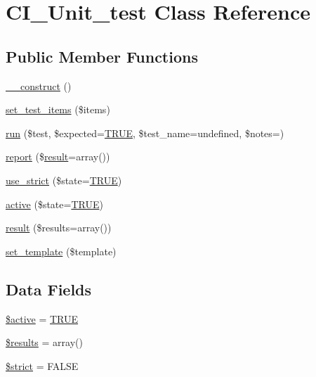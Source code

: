 \hypertarget{class_c_i___unit__test}{}\section{C\+I\+\_\+\+Unit\+\_\+test Class Reference}
\label{class_c_i___unit__test}
\subsection*{Public Member Functions}
\begin{DoxyCompactItemize}
\item 
\mbox{\hyperlink{class_c_i___unit__test_a095c5d389db211932136b53f25f39685}{\+\_\+\+\_\+construct}} ()
\item 
\mbox{\hyperlink{class_c_i___unit__test_a78e364204a36821e23124ae97d447aa3}{set\+\_\+test\+\_\+items}} (\$items)
\item 
\mbox{\hyperlink{class_c_i___unit__test_a0bb74f4cb9553ace4034633e69383c55}{run}} (\$test, \$expected=\mbox{\hyperlink{constants_8php_ae04a3efe6aa42044f803ee90c2277846}{T\+R\+UE}}, \$test\+\_\+name=\textquotesingle{}undefined\textquotesingle{}, \$notes=\textquotesingle{}\textquotesingle{})
\item 
\mbox{\hyperlink{class_c_i___unit__test_a339c46eabb709c1c492bc264c9634171}{report}} (\$\mbox{\hyperlink{class_c_i___unit__test_adcfdd404b2f2610e0690b4beb7786ce5}{result}}=array())
\item 
\mbox{\hyperlink{class_c_i___unit__test_a3b12a79f69fab4221a0b887bdac1ba83}{use\+\_\+strict}} (\$state=\mbox{\hyperlink{constants_8php_ae04a3efe6aa42044f803ee90c2277846}{T\+R\+UE}})
\item 
\mbox{\hyperlink{class_c_i___unit__test_ac7b3030630fc7dd31513c75cf27c1a8a}{active}} (\$state=\mbox{\hyperlink{constants_8php_ae04a3efe6aa42044f803ee90c2277846}{T\+R\+UE}})
\item 
\mbox{\hyperlink{class_c_i___unit__test_adcfdd404b2f2610e0690b4beb7786ce5}{result}} (\$results=array())
\item 
\mbox{\hyperlink{class_c_i___unit__test_ae65d1ab2a626d4ddfda31befc2b347f6}{set\+\_\+template}} (\$template)
\end{DoxyCompactItemize}
\subsection*{Data Fields}
\begin{DoxyCompactItemize}
\item 
\mbox{\hyperlink{class_c_i___unit__test_aacd1fa47b7ea59451aff98beca4360ae}{\$active}} = \mbox{\hyperlink{constants_8php_ae04a3efe6aa42044f803ee90c2277846}{T\+R\+UE}}
\item 
\mbox{\hyperlink{class_c_i___unit__test_a233d12bd8b6d3453e9a7a3f0b8c31db2}{\$results}} = array()
\item 
\mbox{\hyperlink{class_c_i___unit__test_a856bf794dded1ba70be4dfae635a1b06}{\$strict}} = F\+A\+L\+SE
\end{DoxyCompactItemize}
